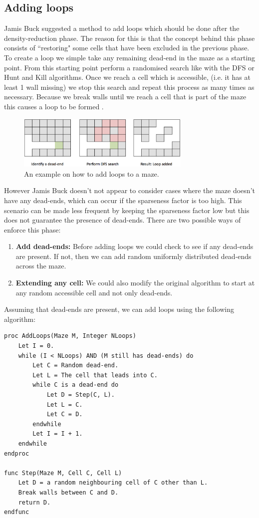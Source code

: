 \subsection{Adding loops}
Jamis Buck suggested a method to add loops which should be done after the density-reduction phase. The reason for this is that the concept behind this phase consists of ``restoring" some cells that have been excluded in the previous phase. To create a loop we simple take any remaining dead-end in the maze as a starting point. From this starting point perform a randomised search like with the DFS or Hunt and Kill algorithms. Once we reach a cell which is accessible, (i.e. it has at least 1 wall missing) we stop this search and repeat this process as many times as necessary. Because we break walls until we reach a cell that is part of the maze this causes a loop to be formed \citep{JBuck}.

\begin{figure}[h!]
\centering
 \includegraphics[width=0.74\textwidth]{images/adding_loops.png}
\caption{An example on how to add loops to a maze.}
\end{figure}

However Jamis Buck doesn't not appear to consider cases where the maze doesn't have any dead-ends, which can occur if the sparseness factor is too high. This scenario can be made less frequent by keeping the sparseness factor low but this does not guarantee the presence of dead-ends. There are two possible ways of enforce this phase:
\begin{enumerate}
\item {\bf Add dead-ends:} Before adding loops we could check to see if any dead-ends are present. If not, then we can add random uniformly distributed dead-ends across the maze.
\item {\bf Extending any cell:} We could also modify the original algorithm to start at any random accessible cell and not only dead-ends.
\end{enumerate}

Assuming that dead-ends are present, we can add loops using the following algorithm:
\lstAlgo
\begin{lstlisting}
proc AddLoops(Maze M, Integer NLoops)
	Let I = 0.
	while (I < NLoops) AND (M still has dead-ends) do
		Let C = Random dead-end.
		Let L = The cell that leads into C.
		while C is a dead-end do
			Let D = Step(C, L).
			Let L = C.
			Let C = D.
		endwhile
		Let I = I + 1.
	endwhile
endproc

func Step(Maze M, Cell C, Cell L)
	Let D = a random neighbouring cell of C other than L.
	Break walls between C and D.
	return D.
endfunc
\end{lstlisting}

